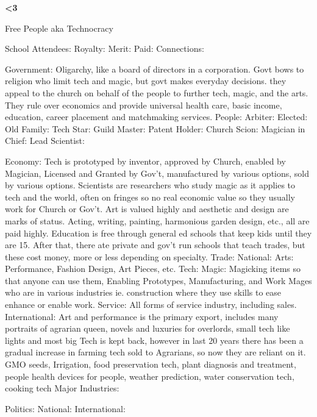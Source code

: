 \documentclass[blue]{GL2020}
\begin{document}
\name{\bTest{}}

\bf{<3}

Free People aka Technocracy

School Attendees:
	Royalty:
	Merit:
	Paid:
	Connections:

Government:  Oligarchy, like a board of directors in a corporation.  Govt bows to religion who limit tech and magic, but govt makes everyday decisions.  they appeal to the church on behalf of the people to further tech, magic, and the arts.  They rule over economics and provide universal health care, basic income, education, career placement and matchmaking services.
	People:		Arbiter:
						Elected:
						Old Family:
						Tech Star:
						Guild Master:
						Patent Holder:
						Church Scion:
						Magician in Chief:
						Lead Scientist:
	
Economy:		Tech is prototyped by inventor, approved by Church, enabled by Magician, Licensed and Granted 
						by Gov't, manufactured by various options, sold by various options.  Scientists are researchers 
						who study magic as it applies to tech and the world, often on fringes so no real economic value 
						so they usually work for Church or Gov't.
						Art is valued highly and aesthetic and design are marks of status.  Acting, writing, painting,
						harmonious garden design, etc., all are paid highly.
						Education is free through general ed schools that keep kids until they are 15.  After that, there
						ate private and gov't run schools that teach trades, but these cost money, more or less depending 
						on specialty.
	Trade:		National:		Arts:		Performance, Fashion Design, Art Pieces, etc.
												Tech:		
												Magic:		Magicking items so that anyone can use them, Enabling Prototypes,
												Manufacturing, and Work Mages who are in various industries ie. construction 
												where they use skills to ease enhance or enable work.
												Service:		All forms of service industry, including sales.
						International:		Art and performance is the primary export, includes many portraits of agrarian queen, novels and luxuries for overlords, small tech like lights and most big Tech is kept back, however in last 20 years there has been a gradual increase in farming tech sold to Agrarians, so now they are reliant on it.  GMO seeds, Irrigation, food preservation tech, plant diagnosis and treatment, people health devices for people, weather prediction, water conservation tech, cooking tech
	Major Industries:
	
Politics:
	National:
	International:
	
\end{document}
